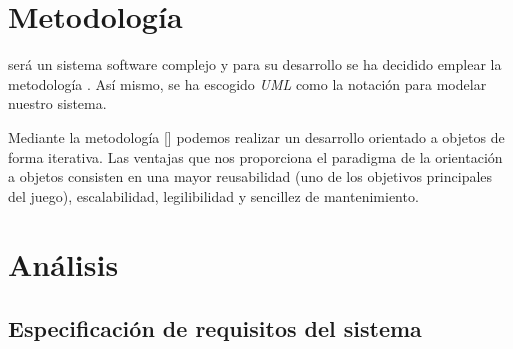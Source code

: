 
\section{Metodología}
\nombrejuego será un sistema software complejo y para su desarrollo se ha decidido emplear la metodología . Así mismo, se ha escogido \emph{UML} como la notación para modelar nuestro sistema.

Mediante la metodología [] podemos realizar un desarrollo orientado a objetos de forma iterativa. Las ventajas que nos proporciona el paradigma de la orientación a objetos consisten en una mayor reusabilidad (uno de los objetivos principales del juego), escalabilidad, legilibilidad y sencillez de mantenimiento.

\section{Análisis}
\subsection{Especificación de requisitos del sistema}
